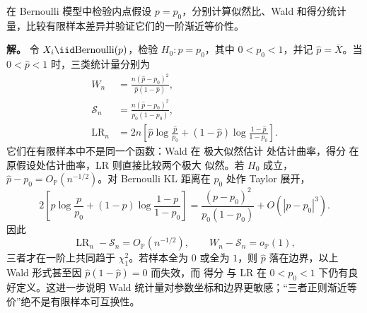 \begin{exbox}
在 Bernoulli 模型中检验内点假设 $p=p_0$，分别计算似然比、Wald 和得分统计量，比较有限样本差异并验证它们的一阶渐近等价性。

\textbf{解。} 令 $X_i\iid\mathrm{Bernoulli}(p)$，检验 $H_0:p=p_0$，其中 $0<p_0<1$，并记 $\widehat p=\overline X$。当 $0<\widehat p<1$ 时，三类统计量分别为
\begin{align*}
 W_n
 &=\frac{n(\widehat p-p_0)^2}
 {\widehat p(1-\widehat p)},\\
 \mathcal S_n
 &=\frac{n(\widehat p-p_0)^2}
 {p_0(1-p_0)},\\
 \operatorname{LR}_n
 &=2n\left[
 \widehat p\log\frac{\widehat p}{p_0}
 +(1-\widehat p)\log\frac{1-\widehat p}{1-p_0}
 \right].
\end{align*}
它们在有限样本中不是同一个函数：Wald 在 极大似然估计 处估计曲率，得分 在原假设处估计曲率，LR 则直接比较两个极大 似然。若 $H_0$ 成立，$\widehat p-p_0=O_{\mathbb P}(n^{-1/2})$。对 Bernoulli KL 距离在 $p_0$ 处作 Taylor 展开，
\[
 2\left[
 p\log\frac p{p_0}
 +(1-p)\log\frac{1-p}{1-p_0}
 \right]
 =\frac{(p-p_0)^2}{p_0(1-p_0)}
 +O(|p-p_0|^3).
\]
因此
\[
 \operatorname{LR}_n-\mathcal S_n=O_{\mathbb P}(n^{-1/2}),
 \qquad
 W_n-\mathcal S_n=o_{\mathbb P}(1),
\]
三者才在一阶上共同趋于 $\chi^2_1$。若样本全为 $0$ 或全为 $1$，则 $\widehat p$ 落在边界，以上 Wald 形式甚至因 $\widehat p(1-\widehat p)=0$ 而失效，而 得分 与 LR 在 $0<p_0<1$ 下仍有良好定义。这进一步说明 Wald 统计量对参数坐标和边界更敏感；“三者正则渐近等价”绝不是有限样本可互换性。
\end{exbox}
